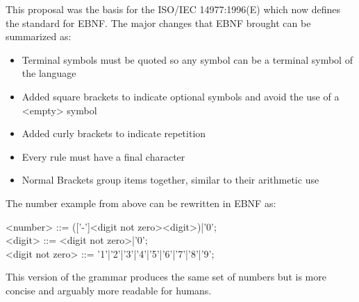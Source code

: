 This proposal was the basis for the ISO/IEC 14977:1996(E) which now defines the standard for \ac{EBNF}. The major changes that \ac{EBNF} brought can be summarized as: \parencite[cf.][p. VI]{isoiec_149771996e_information_1996}
\begin{itemize}[noitemsep]
    \item Terminal symbols must be quoted so any symbol can be a terminal symbol of the language
    \item Added square brackets to indicate optional symbols and avoid the use of a <empty> symbol
    \item Added curly brackets to indicate repetition
    \item Every rule must have a final character
    \item Normal Brackets group items together, similar to their arithmetic use
\end{itemize}
The number example from above can be rewritten in \ac{EBNF} as:
\begin{grammar}
    <number> ::= (['-']<digit not zero>{<digit>})|'0'; \\
    <digit> ::= <digit not zero>|'0'; \\
    <digit not zero> ::= '1'|'2'|'3'|'4'|'5'|'6'|'7'|'8'|'9';
\end{grammar}
This version of the grammar produces the same set of numbers but is more concise and arguably more readable for humans.
